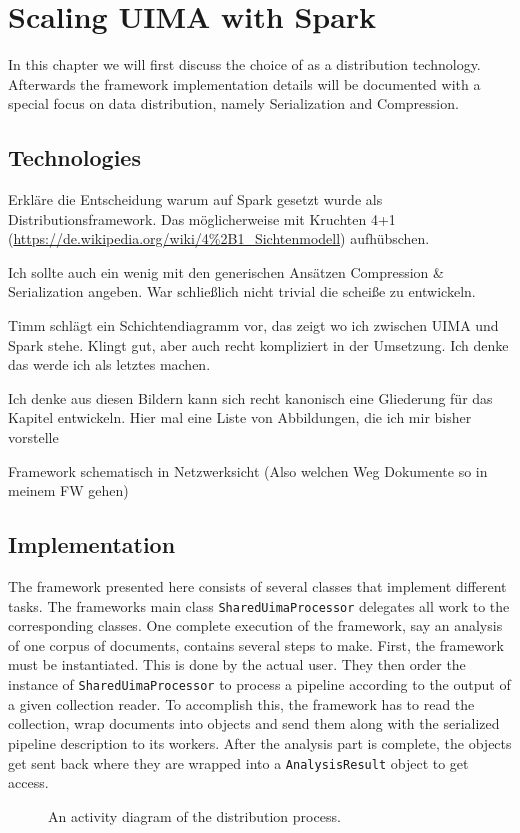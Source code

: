 \chapter{Scaling UIMA with Spark}
\label{ch:implementation}
In this chapter we will first discuss the choice of \spark{} as a distribution technology. Afterwards the framework implementation details will be documented with a special focus on data distribution, namely Serialization and Compression.
\section{Technologies}


Erkläre die Entscheidung warum auf Spark gesetzt wurde als Distributionsframework. Das möglicherweise mit Kruchten 4+1 (\url{https://de.wikipedia.org/wiki/4\%2B1_Sichtenmodell})  aufhübschen.

Ich sollte auch ein wenig mit den generischen Ansätzen Compression \& Serialization angeben. War schließlich nicht trivial die scheiße zu entwickeln.

Timm schlägt ein Schichtendiagramm vor, das zeigt wo ich zwischen UIMA und Spark stehe. Klingt gut, aber auch recht kompliziert in der Umsetzung. Ich denke das werde ich als letztes machen.

Ich denke aus diesen Bildern kann sich recht kanonisch eine Gliederung für das Kapitel entwickeln. Hier mal eine Liste von Abbildungen, die ich mir bisher vorstelle

Framework schematisch in Netzwerksicht (Also welchen Weg Dokumente so in meinem FW gehen)



\section{Implementation}

The framework presented here consists of several classes that implement different tasks. The frameworks main class \lstinline|SharedUimaProcessor| delegates all work to the corresponding classes. One complete execution of the framework, say an analysis of one corpus of documents, contains several steps to make. First, the framework must be instantiated. This is done by the actual user. They then order the instance of \lstinline|SharedUimaProcessor| to process a pipeline according to the output of a given collection reader. To accomplish this, the framework has to read the collection, wrap documents into \cas{} objects and send them along with the serialized pipeline description to its workers. After the analysis part is complete, the \cas{} objects get sent back where they are wrapped into a \lstinline|AnalysisResult| object to get access. 
\begin{figure}[!htb]
	\centering
	\resizebox{0.8\linewidth}{!}{\small}
	\caption[An UML activity diagram of the CAS distribution process.]{An \uml{} activity diagram of the \cas{} distribution process.}
	\label{fig:sup_act}
\end{figure}

